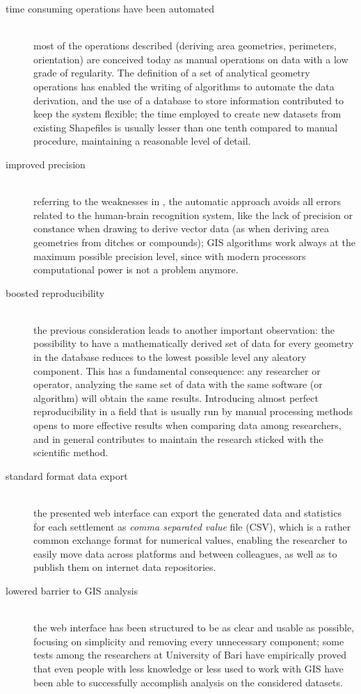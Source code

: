             \begin{description}
                \item[time consuming operations have been automated]\hfill\\most of the operations described (deriving area geometries, perimeters, orientation) are conceived today as manual operations on data with a low grade of regularity. The definition of a set of analytical geometry operations has enabled the writing of algorithms to automate the data derivation, and the use of a database to store information contributed to keep the system flexible; the time employed to create new datasets from existing Shapefiles is usually lesser than one tenth compared to manual procedure, maintaining a reasonable level of detail.
                \item[improved precision]\hfill\\referring to the weaknesses in , the automatic approach avoids all errors related to the human-brain recognition system, like the lack of precision or constance when drawing to derive vector data (as when deriving area geometries from ditches or compounds); GIS algorithms work always at the maximum possible precision level, since with modern processors computational power is not a problem anymore.
                \item[boosted reproducibility]\hfill\\the previous consideration leads to another important observation: the possibility to have a mathematically derived set of data for every geometry in the database reduces to the lowest possible level any aleatory component. This has a fundamental consequence: any researcher or operator, analyzing the same set of data with the same software (or algorithm) will obtain the same results. Introducing almost perfect reproducibility in a field that is usually run by manual processing methods opens to more effective results when comparing data among researchers, and in general contributes to maintain the research sticked with the scientific method.
                \item[standard format data export]\hfill\\the presented web interface can export the generated data and statistics for each settlement as \emph{comma separated value} file (CSV), which is a rather common exchange format for numerical values, enabling the researcher to easily move data across platforms and between colleagues, as well as to publish them on internet data repositories.
                \item[lowered barrier to GIS analysis]\hfill\\the web interface has been structured to be as clear and usable as possible, focusing on simplicity and removing every unnecessary component; some tests among the researchers at University of Bari have empirically proved that even people with less knowledge or less used to work with GIS have been able to successfully accomplish analysis on the considered datasets.
            \end{description}

